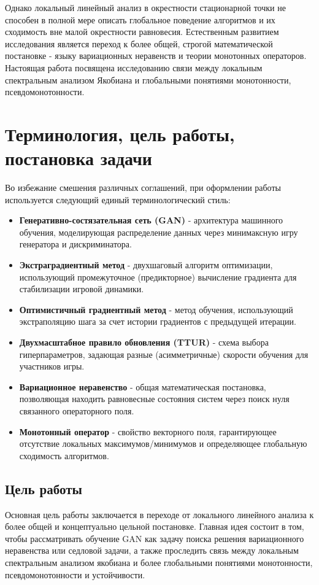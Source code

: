 \documentclass[12pt,a4paper]{article}
\begin{document}
	Однако локальный линейный анализ в окрестности стационарной точки не способен в полной мере описать глобальное поведение алгоритмов и их сходимость вне малой окрестности равновесия. Естественным развитием исследования является переход к более общей, строгой  математической постановке - языку вариационных неравенств и теории монотонных операторов. Настоящая работа посвящена исследованию связи между локальным спектральным анализом Якобиана и глобальными понятиями монотонности, псевдомонотонности. 
	\section{Терминология, цель работы, постановка задачи}

	Во избежание смешения различных соглашений, при оформлении работы используется следующий единый терминологический стиль:
	\begin{itemize}
		\item \textbf{Генеративно-состязательная сеть (GAN)} - архитектура машинного обучения, моделирующая распределение данных через минимаксную игру генератора и дискриминатора.
		\item \textbf{Экстраградиентный метод} - двухшаговый алгоритм оптимизации, использующий промежуточное (предикторное) вычисление градиента для стабилизации игровой динамики.
		\item \textbf{Оптимистичный градиентный метод} - метод обучения, использующий экстраполяцию шага за счет истории градиентов с предыдущей итерации.
		\item \textbf{Двухмасштабное правило обновления (TTUR)} - схема выбора гиперпараметров, задающая разные (асимметричные) скорости обучения для участников игры.
		\item \textbf{Вариационное неравенство} - общая математическая постановка, позволяющая находить равновесные состояния систем через поиск нуля связанного операторного поля.
		\item \textbf{Монотонный оператор} - свойство векторного поля, гарантирующее отсутствие локальных максимумов/минимумов и определяющее глобальную сходимость алгоритмов.
	\end{itemize}
	
	\subsection{Цель работы}
	Основная цель работы заключается в переходе от локального линейного анализа к более общей и концептуально цельной постановке. Главная идея состоит в том, чтобы рассматривать обучение GAN как задачу поиска решения вариационного неравенства или седловой задачи, а также проследить связь между локальным спектральным анализом якобиана и более глобальными понятиями монотонности, псевдомонотонности и устойчивости.
	
\end{document}
